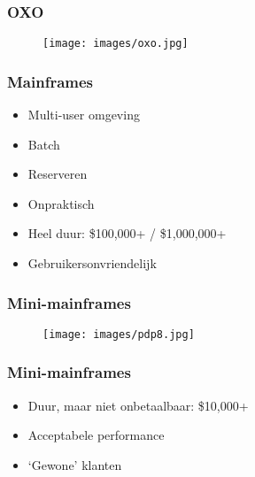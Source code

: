 \documentclass[aspectratio=43]{uva-inf-presentation}
\begin{document}

\begin{frame}
\frametitle{OXO}

\begin{figure}
\texttt{[image: images/oxo.jpg]}
\end{figure}

\end{frame}


\begin{frame}
\frametitle{Mainframes}

\begin{itemize}
\item Multi-user omgeving
\item Batch
\item Reserveren
\item Onpraktisch
\item Heel duur: \$100,000+ / \$1,000,000+
\item Gebruikersonvriendelijk
\end{itemize}

\end{frame}


\begin{frame}
\frametitle{Mini-mainframes}

\begin{figure}
\texttt{[image: images/pdp8.jpg]}
\end{figure}

\end{frame}


\begin{frame}
\frametitle{Mini-mainframes}

\begin{itemize}
\item Duur, maar niet onbetaalbaar: \$10,000+
\item Acceptabele performance
\item `Gewone' klanten
\end{itemize}

\end{frame}
\end{document}
